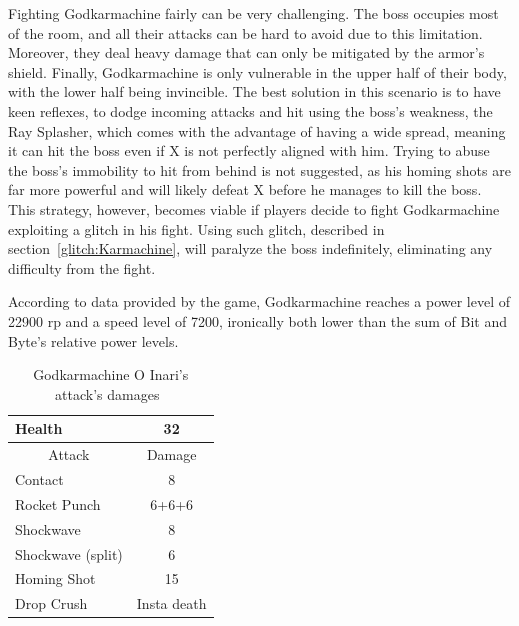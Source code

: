 Fighting Godkarmachine fairly can be very challenging. The boss occupies most of the room, and all their attacks can be hard to avoid due to this limitation. Moreover, they deal heavy damage that can only be mitigated by the armor's shield. Finally, Godkarmachine is only vulnerable in the upper half of their body, with the lower half being invincible. The best solution in this scenario is to have keen reflexes, to dodge incoming attacks and hit using the boss's weakness, the Ray Splasher, which comes with the advantage of having a wide spread, meaning it can hit the boss even if X is not perfectly aligned with him. Trying to abuse the boss's immobility to hit from behind is not suggested, as his homing shots are far more powerful and will likely defeat X before he manages to kill the boss. This strategy, however, becomes viable if players decide to fight Godkarmachine exploiting a glitch in his fight. Using such glitch, described in section~\ref{glitch:Karmachine}, will paralyze the boss indefinitely, eliminating any difficulty from the fight. 

According to data provided by the game, Godkarmachine reaches a power level of 22900 rp and a speed level of 7200, ironically both lower than the sum of Bit and Byte's relative power levels.

\begin{table}[htp]
	\centering
	\begin{tabular}[h]{l c}
		\toprule
		Health  & 32\\
		\midrule
		\multicolumn{1}{c}{Attack} & \multicolumn{1}{c}{Damage}\\
		Contact & 8\\
		Rocket Punch& 6+6+6\\
		Shockwave& 8\\
		Shockwave (split)& 6\\
		Homing Shot& 15\\
		Drop Crush& Insta death\\
		\bottomrule
	\end{tabular}
	\caption{Godkarmachine O Inari's attack's damages~\cite{wiki:Godkarmachine,book:Compendium}}
\end{table} 


